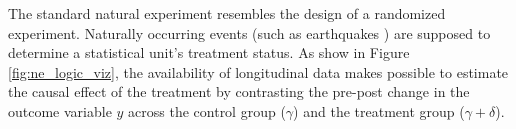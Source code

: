 
The standard natural experiment resembles the
design of a randomized experiment. Naturally occurring events (such
as earthquakes \parencite[e.g.,][]{Belloc2016}) are supposed 
to determine a statistical unit's treatment status. As show in
Figure \ref{fig:ne_logic_viz}, the availability of longitudinal data
makes possible to estimate the causal effect of the treatment by
contrasting the pre-post change in the outcome variable $y$ across
the control group ($\gamma$) and the treatment group 
($ \gamma + \delta$).
